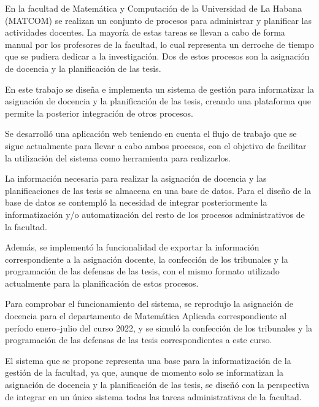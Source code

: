\begin{conclusions}
    En la facultad de Matemática y Computación de la Universidad de La Habana (MATCOM)
se realizan un conjunto de procesos para administrar y planificar las actividades docentes. 
La mayoría de estas tareas se llevan a cabo de forma manual por los profesores de la facultad, lo cual representa
un derroche de tiempo que se pudiera dedicar a la investigación.
Dos de estos procesos son la asignación de docencia y la planificación de las tesis. 

En este trabajo se diseña e implementa un sistema de gestión para informatizar 
la asignación de docencia y la planificación de las tesis, creando una plataforma que permite 
la posterior integración de otros procesos.

    
Se desarrolló una aplicación web teniendo en cuenta el flujo de trabajo que se sigue actualmente para 
llevar a cabo ambos procesos, con el objetivo de facilitar la utilización del sistema como herramienta
para realizarlos.

La información necesaria para realizar la asignación de docencia y 
las planificaciones de las tesis  
se almacena en una base de datos.
Para el diseño de la base de datos se contempló la necesidad de integrar 
posteriormente la informatización y/o automatización del resto de los procesos 
administrativos de la facultad.

Además, se implementó la funcionalidad de exportar la
información correspondiente a la asignación docente,
la confección de los tribunales y la programación de las defensas de las tesis, 
con el mismo formato utilizado actualmente para la planificación de estos procesos.


Para comprobar el funcionamiento del sistema,
se reprodujo la asignación de docencia para el departamento 
de Matemática Aplicada correspondiente al período 
enero--julio del curso 2022, y se simuló la confección de los tribunales 
y la programación de las defensas de las tesis correspondientes
a este curso. 

El sistema que se propone representa una base para la informatización de la gestión de la facultad,
ya que, aunque de momento solo se informatizan la asignación de docencia
y la planificación de las tesis, se diseñó
con la perspectiva de integrar en un único sistema todas las tareas
administrativas de la facultad. \\


\end{conclusions}
